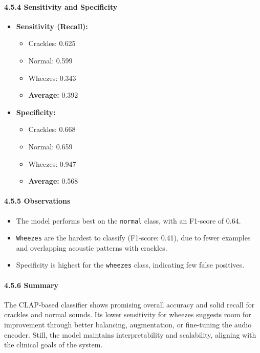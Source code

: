\paragraph{4.5.4 Sensitivity and Specificity\\}
\begin{itemize}
    \item \textbf{Sensitivity (Recall):}
    \begin{itemize}
        \item Crackles: 0.625
        \item Normal: 0.599
        \item Wheezes: 0.343
        \item \textbf{Average:} 0.392
    \end{itemize}
    
    \item \textbf{Specificity:}
    \begin{itemize}
        \item Crackles: 0.668
        \item Normal: 0.659
        \item Wheezes: 0.947
        \item \textbf{Average:} 0.568
    \end{itemize}
\end{itemize}

\paragraph{4.5.5 Observations\\}
\begin{itemize}
    \item The model performs best on the \texttt{normal} class, with an F1-score of 0.64.
    \item \texttt{Wheezes} are the hardest to classify (F1-score: 0.41), due to fewer examples and overlapping acoustic patterns with crackles.
    \item Specificity is highest for the \texttt{wheezes} class, indicating few false positives.
\end{itemize}

\paragraph{4.5.6 Summary\\}
The CLAP-based classifier shows promising overall accuracy and solid recall for crackles and normal sounds. Its lower sensitivity for wheezes suggests room for improvement through better balancing, augmentation, or fine-tuning the audio encoder. Still, the model maintains interpretability and scalability, aligning with the clinical goals of the system.
